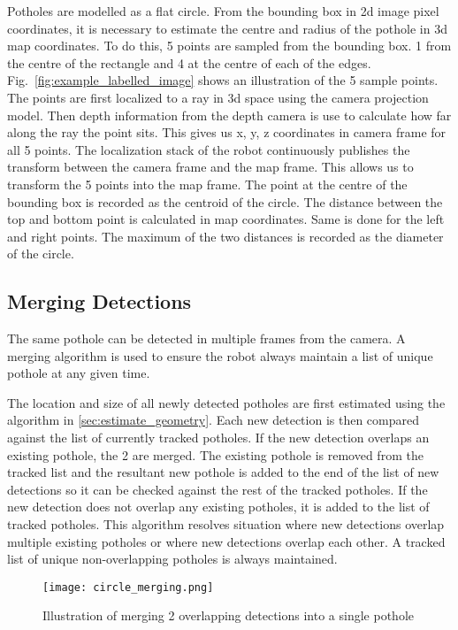 \documentclass[conference]{IEEEtran}
\begin{document}
Potholes are modelled as a flat circle. From the bounding box in 2d image pixel coordinates, it is necessary to estimate the centre and radius of the pothole in 3d map coordinates.
To do this, 5 points are sampled from the bounding box. 1 from the centre of the rectangle and 4 at the centre of each of the edges. Fig.~\ref{fig:example_labelled_image} shows an illustration of the 5 sample points. The points are first localized to a ray in 3d space using the camera projection model. Then depth information from the depth camera is use to calculate how far along the ray the point sits. This gives us x, y, z coordinates in camera frame for all 5 points. The localization stack of the robot continuously publishes the transform between the camera frame and the map frame. This allows us to transform the 5 points into the map frame. The point at the centre of the bounding box is recorded as the centroid of the circle. The distance between the top and bottom point is calculated in map coordinates. Same is done for the left and right points. The maximum of the two distances is recorded as the diameter of the circle.

\subsection{Merging Detections}

The same pothole can be detected in multiple frames from the camera. A merging algorithm is used to ensure the robot always maintain a list of unique pothole at any given time.

The location and size of all newly detected potholes are first estimated using the algorithm in \ref{sec:estimate_geometry}. Each new detection is then compared against the list of currently tracked potholes. If the new detection overlaps an existing pothole, the 2 are merged. The existing pothole is removed from the tracked list and the resultant new pothole is added to the end of the list of new detections so it can be checked against the rest of the tracked potholes. If the new detection does not overlap any existing potholes, it is added to the list of tracked potholes. This algorithm resolves situation where new detections overlap multiple existing potholes or where new detections overlap each other. A tracked list of unique non-overlapping potholes is always maintained.

\begin{figure}
    \centering
    \texttt{[image: circle\_merging.png]}
    \caption{Illustration of merging 2 overlapping detections into a single pothole}
    \label{fig:merging}
\end{figure}
\end{document}
